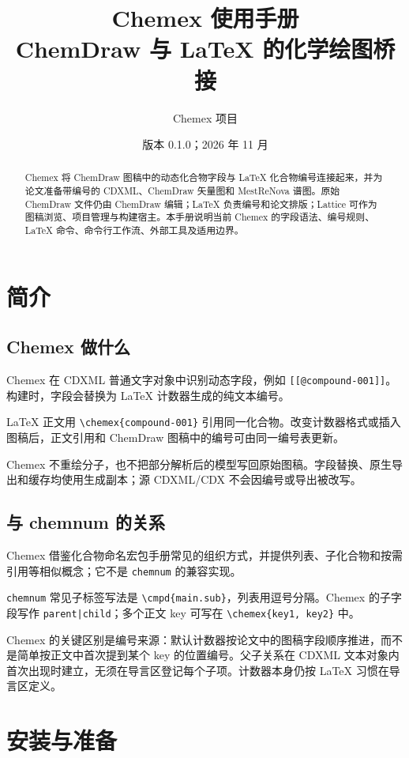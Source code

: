 \documentclass[UTF8,12pt,a4paper]{ctexart}
\title{Chemex 使用手册\\\large ChemDraw 与 LaTeX 的化学绘图桥接}
\author{Chemex 项目}
\date{版本 0.1.0；2026 年 11 月}
\begin{document}
\maketitle

\begin{abstract}
Chemex 将 ChemDraw 图稿中的动态化合物字段与 LaTeX 化合物编号连接起来，并为论文准备带编号的 CDXML、ChemDraw 矢量图和 MestReNova 谱图。原始 ChemDraw 文件仍由 ChemDraw 编辑；LaTeX 负责编号和论文排版；Lattice 可作为图稿浏览、项目管理与构建宿主。本手册说明当前 Chemex 的字段语法、编号规则、LaTeX 命令、命令行工作流、外部工具及适用边界。
\end{abstract}

\tableofcontents
\newpage

\section{简介}

\subsection{Chemex 做什么}

Chemex 在 CDXML 普通文字对象中识别动态字段，例如 \verb|[[@compound-001]]|。构建时，字段会替换为 LaTeX 计数器生成的纯文本编号。

LaTeX 正文用 \verb|\chemex{compound-001}| 引用同一化合物。改变计数器格式或插入图稿后，正文引用和 ChemDraw 图稿中的编号可由同一编号表更新。

Chemex 不重绘分子，也不把部分解析后的模型写回原始图稿。字段替换、原生导出和缓存均使用生成副本；源 CDXML/CDX 不会因编号或导出被改写。

\subsection{与 chemnum 的关系}

Chemex 借鉴化合物命名宏包手册常见的组织方式，并提供列表、子化合物和按需引用等相似概念；它不是 \texttt{chemnum} 的兼容实现。

\texttt{chemnum} 常见子标签写法是 \verb|\cmpd{main.sub}|，列表用逗号分隔。Chemex 的子字段写作 \verb!parent|child!；多个正文 key 可写在 \verb|\chemex{key1, key2}| 中。

Chemex 的关键区别是编号来源：默认计数器按论文中的图稿字段顺序推进，而不是简单按正文中首次提到某个 key 的位置编号。父子关系在 CDXML 文本对象内首次出现时建立，无须在导言区登记每个子项。计数器本身仍按 LaTeX 习惯在导言区定义。

\section{安装与准备}
\end{document}
